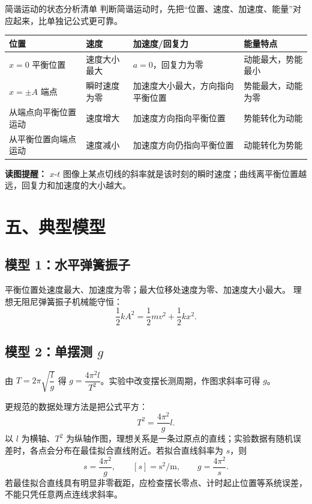 \begin{learningbox}{简谐运动的状态分析清单}
判断简谐运动时，先把“位置、速度、加速度、能量”对应起来，比单独记公式更可靠。
\begin{center}
\small
\begin{tabular}{p{}p{}p{}p{}}
\toprule
位置 & 速度 & 加速度/回复力 & 能量特点 \\
\midrule
$x=0$ 平衡位置 & 速度大小最大 & $a=0$，回复力为零 & 动能最大，势能最小 \\
$x=\pm A$ 端点 & 瞬时速度为零 & 加速度大小最大，方向指向平衡位置 & 势能最大，动能为零 \\
从端点向平衡位置运动 & 速度增大 & 加速度方向指向平衡位置 & 势能转化为动能 \\
从平衡位置向端点运动 & 速度减小 & 加速度方向仍指向平衡位置 & 动能转化为势能 \\
\bottomrule
\end{tabular}
\end{center}
\textbf{读图提醒：} $x$-$t$ 图像上某点切线的斜率就是该时刻的瞬时速度；曲线离平衡位置越远，回复力和加速度的大小越大。
\end{learningbox}

\section*{五、典型模型}

\subsection*{模型 1：水平弹簧振子}

平衡位置处速度最大、加速度为零；最大位移处速度为零、加速度大小最大。
理想无阻尼弹簧振子机械能守恒：
\[
\dfrac12 kA^2 = \dfrac12 mv^2 + \dfrac12 kx^2.
\]

\subsection*{模型 2：单摆测 $g$}

由 $T = 2\pi\sqrt{\dfrac{l}{g}}$ 得 $g = \dfrac{4\pi^2 l}{T^2}$。实验中改变摆长测周期，作图求斜率可得 $g$。

更规范的数据处理方法是把公式平方：
\[
T^2=\frac{4\pi^2}{g}l.
\]
以 $l$ 为横轴、$T^2$ 为纵轴作图，理想关系是一条过原点的直线；实验数据有随机误差时，各点会分布在最佳拟合直线附近。若拟合直线斜率为 $s$，则
\[
s=\frac{4\pi^2}{g},\qquad [s]=\mathrm{s^2/m},\qquad
g=\frac{4\pi^2}{s}.
\]
若最佳拟合直线具有明显非零截距，应检查摆长零点、计时起止位置等系统误差，不能只凭任意两点连线求斜率。

